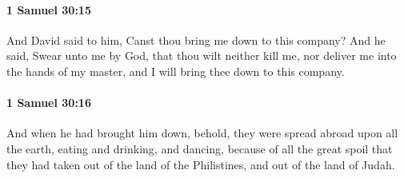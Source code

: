 		\paragraph{1 Samuel 30:15} %
			\label{1SAMUEL-30-15}

			And David said to him, Canst thou bring me down to this company? And he said, Swear unto me by God, that thou wilt neither kill me, nor deliver me into the hands of my master, and I will bring thee down to this company.


		\paragraph{1 Samuel 30:16} %
			\label{1SAMUEL-30-16}

			And when he had brought him down, behold, they were spread abroad upon all the earth, eating and drinking, and dancing, because of all the great spoil that they had taken out of the land of the Philistines, and out of the land of Judah.

